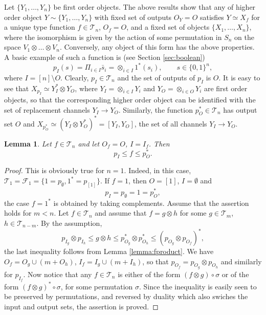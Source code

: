 \documentclass[12pt]{article}
\newtheorem{lemma}{Lemma}
\theoremstyle{definition}
\theoremstyle{remark}
\def\Te{\mathcal T}
\def\Fe{\mathcal F}
\begin{document}
Let $\{Y_1,\dots, Y_n\}$ be first order objects.
The above results show that any of higher order object  $Y\sim \{Y_1,\dots,Y_n\}$ with
fixed set of outputs $O_Y=O$ satisfies $Y\simeq X_f$ for a unique type function $f\in
\Te_n$, $O_f=O$,  and a fixed set of objects $\{X_1,\dots,X_n\}$, where the isomorphism is given
by the action of some 
permutation in $S_n$ on the space  $V_1\otimes\dots\otimes  V_n$. Conversely, any object
of this form has the above properties. A basic example of such a function is (see Section
\ref{sec:boolean})
\[
p_I(s)= \Pi_{i\in I} \bar s_i=\otimes_{i\in I} 1^*(s_i),\qquad s\in \{0,1\}^n,
\]
where $I=[n]\setminus O$. Clearly, $p_I\in \Te_n$ and the set of outputs of $p_I$ is $O$. It is easy to see that $X_{p_I}\simeq  Y_I^*\otimes Y_O$,
where $Y_I=\otimes_{i\in I} Y_i$ and $Y_O= \otimes_{i\in O} Y_i$ are first order objects, so that the corresponding
higher order object can be identified with the set of replacement channels $Y_I\to Y_O$.
Similarly, the function $p_O^*\in \Te_n$ has output set $O$ and $X_{p_O^*}\simeq
(Y_I\otimes Y_O^*)^*=[Y_I,Y_O]$, the set of all channels $Y_I\to Y_O$. 

\begin{lemma}\label{lemma:fh_setting} Let $f\in\Te_n$ and let $O_f=O$,  $I=I_f$. Then
\[
p_I\le f\le p_O^*.
\]

\end{lemma}

\begin{proof} This is obviously true for $n=1$. Indeed, in this case,
$\Te_1=\Fe_1=\{1=p_\emptyset,1^*=p_{[1]}\}$. If $f=1$, then $O=[1]$, $I=\emptyset$ and 
\[
p_I=p_{\emptyset}=1=p_O^*,
\]
the case  $f=1^*$ is obtained by taking complements. Assume that the assertion holds for
$m<n$. Let $f\in \Te_n$ and assume that  $f=g\otimes h$ for some  $g\in
\Te_m$, $h\in \Te_{n-m}$.  By the assumption,
\[
p_{I_g}\otimes p_{I_h}\le g\otimes h\le p^*_{O_g}\otimes p^*_{O_h}\le (p_{O_g}\otimes
p_{O_f})^*,
\]
the last inequality follows from Lemma \ref{lemma:fproduct}. We have  
$O_f=O_g\cup (m+O_h)$, $I_f=I_g\cup (m+I_h)$, so that $p_{O_f}=p_{O_g}\otimes p_{O_h}$ and
similarly for $p_{I_f}$. Now notice that any $f\in \Te_n$ is either of the form $(f\otimes
g)\circ \sigma$ or of the form $(f\otimes g)^*\circ \sigma$, for some permutation
$\sigma$. Since the inequality is easily seen to be preserved by
permutations, and reversed by duality which also swiches the input and output sets, the
assertion is proved.

\end{proof}
\end{document}
